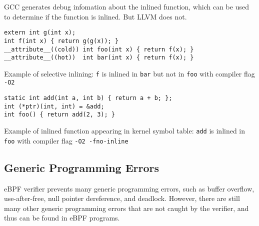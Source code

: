 GCC generates debug infomation about the inlined function, which can be used to determine if the function is inlined. But LLVM does not.


\begin{listing}[t]
  \begin{verbatim}
extern int g(int x);
int f(int x) { return g(g(x)); }
__attribute__((cold)) int foo(int x) { return f(x); }
__attribute__((hot))  int bar(int x) { return f(x); }
\end{verbatim}
  \caption{Example of selective inlining: \texttt{f} is inlined in \texttt{bar} but not in \texttt{foo} with compiler flag \texttt{-O2}}
  \label{fig:compiler_selective_inlining}
\end{listing}

\begin{listing}[t]
  \begin{verbatim}
static int add(int a, int b) { return a + b; };
int (*ptr)(int, int) = &add;
int foo() { return add(2, 3); }
\end{verbatim}
  \caption{Example of inlined function appearing in kernel symbol table: \texttt{add} is inlined in \texttt{foo} with compiler flag \texttt{-O2 -fno-inline}}
  \label{fig:compiler_inlined_in_symbol_table}
\end{listing}

\subsection{Generic Programming Errors}
eBPF verifier prevents many generic programming errors, such as buffer overflow, use-after-free, null pointer dereference, and deadlock.
However, there are still many other generic programming errors that are not caught by the verifier, and thus can be found in eBPF programs.


